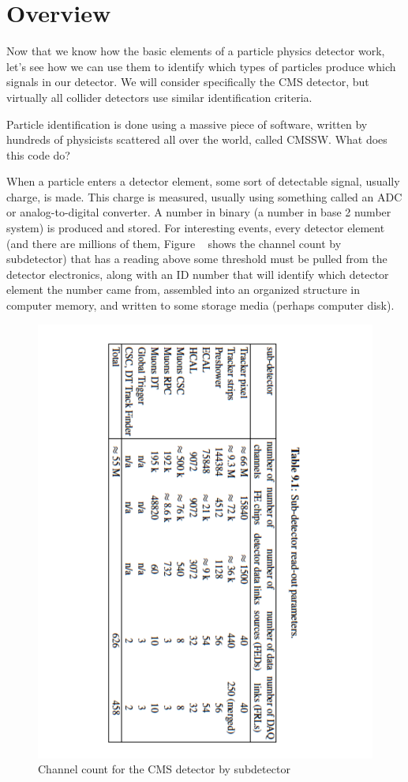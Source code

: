\section{Overview}
Now that we know how the basic elements of a particle physics detector work, let's see how we can use them to identify which types of particles produce which signals in our detector.  
We will consider specifically the CMS detector, but virtually all collider detectors use similar identification criteria.

Particle identification is done using a massive piece of software, written by hundreds of physicists scattered all over the world, called CMSSW.  What does this code do?

When a particle enters a detector element, some sort of detectable signal, usually charge, is made.  This charge is measured, usually using something called an ADC or analog-to-digital converter.  A number in binary (a number in base 2 number system) is produced and stored. For interesting events, every detector element (and there are millions of them, Figure ~\cite{fig:count} shows the channel count by subdetector) that has a reading above some threshold must be pulled from the detector electronics, along with an ID number that will identify which detector element the number came from, assembled into an organized structure in computer memory, and written to some storage media (perhaps computer disk).  

\begin{figure}[h]
\centering\includegraphics[scale=0.6]{./particleID/Pictures/channelcount.pdf}
\caption{Channel count for the CMS detector by subdetector}
\label{fig:count}
\end{figure} 


